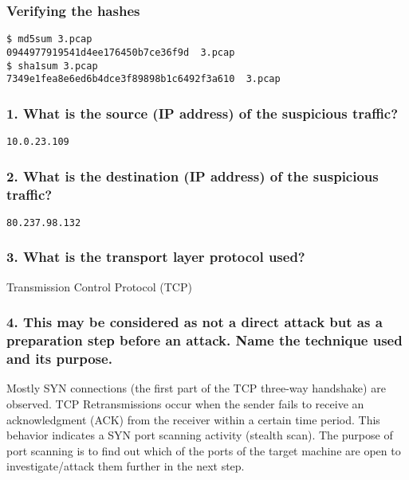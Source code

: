 \subsubsection*{Verifying the hashes}
\begin{verbatim}
$ md5sum 3.pcap 
0944977919541d4ee176450b7ce36f9d  3.pcap
$ sha1sum 3.pcap 
7349e1fea8e6ed6b4dce3f89898b1c6492f3a610  3.pcap
\end{verbatim}
\subsubsection*{1. What is the source (IP address) of the suspicious traffic?}
\texttt{10.0.23.109}
\subsubsection*{2. What is the destination (IP address) of the suspicious traffic?}
\texttt{80.237.98.132}
\subsubsection*{3. What is the transport layer protocol used?}
Transmission Control Protocol (TCP)
\subsubsection*{4. This may be considered as not a direct attack but as a preparation step before an attack. Name the technique used and its purpose.}

Mostly SYN connections (the first part of the TCP three-way handshake) are observed. TCP Retransmissions occur when the sender fails to receive an acknowledgment (ACK) from the receiver within a certain time period. This behavior indicates a SYN port scanning activity (stealth scan). The purpose of port scanning is to find out which of the ports of the target machine are open to investigate/attack them further in the next step.